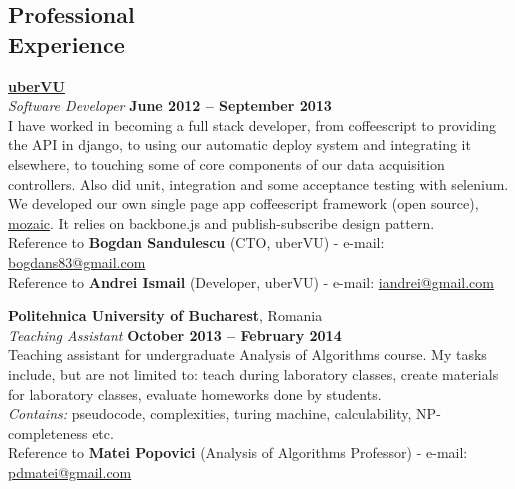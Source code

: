 \documentclass[margin,line]{resume}
\begin{document}
\begin{resume}
    \section{\mysidestyle Professional\\Experience}

	\vspace{1.2mm}\href{http://www.ubervu.com}{\textbf{uberVU}}\vspace{1.5mm}\\
	\vspace{1mm} \textsl{Software Developer} \hfill \textbf{June 2012 -- September 2013}\\
	I have worked in becoming a full stack developer, from coffeescript to providing the API in django, to using our automatic
	deploy system and integrating it elsewhere, to touching some of core components of our data acquisition controllers. Also
	did unit, integration and some acceptance testing with selenium.  We developed our own single page app coffeescript framework
	(open source), \href{https://github.com/uberVU/mozaic}{mozaic}. It relies on backbone.js and publish-subscribe design pattern.\vspace{1.5mm}\\
	\small{Reference to \textbf{Bogdan Sandulescu} (CTO, uberVU) - e-mail: \href{mailto:bogdans83@gmail.com}{bogdans83@gmail.com}}\\
	\small{Reference to \textbf{Andrei Ismail} (Developer, uberVU) - e-mail: \href{mailto:iandrei@gmail.com}{iandrei@gmail.com}}

	\vspace{1.2mm}\textbf{Politehnica University of Bucharest}, Romania \vspace{1.5mm}\\
	\vspace{1mm} \textsl{Teaching Assistant} \hfill \textbf{October 2013 -- February 2014}\\
	Teaching assistant for undergraduate Analysis of Algorithms course.
	My tasks include, but are not limited to: teach during laboratory classes, create materials for laboratory classes,
	evaluate homeworks done by students.\vspace{1.5mm}\\
	\textit{Contains:} pseudocode, complexities, turing machine, calculability, NP-completeness etc.\vspace{1.5mm}\\
	\small{Reference to \textbf{Matei Popovici} (Analysis of Algorithms Professor) - e-mail: \href{mailto:pdmatei@gmail.com}{pdmatei@gmail.com}}


\end{resume}
\end{document}
